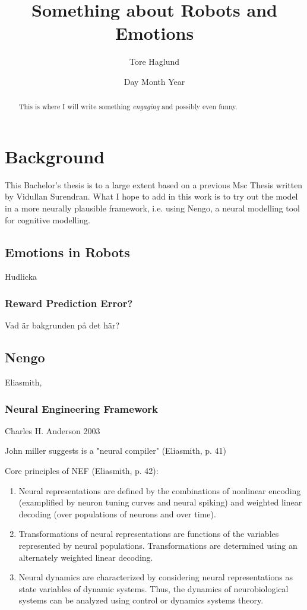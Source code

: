 \documentclass[12pt]{article}
\title{Something about Robots and Emotions}
\author{Tore Haglund}
\date{Day Month Year}
\begin{document}
              
\maketitle

\begin{abstract}
This is where I will write something \emph{engaging} and possibly even funny.
\end{abstract}
\tableofcontents

\section{Background}
This Bachelor's thesis is to a large extent based on a previous Msc Thesis written by Vidullan Surendran. What I hope to add in this work is to try out the model in a more neurally plausible framework, i.e. using Nengo, a neural modelling tool for cognitive modelling. \cite{picardbook} 

\subsection{Emotions in Robots}
Hudlicka 

\subsubsection{Reward Prediction Error?}
Vad är bakgrunden på det här? 

\subsection{Nengo}
Eliasmith,

\subsubsection{Neural Engineering Framework}
Charles H. Anderson 2003

John miller suggests is a "neural compiler" (Eliasmith, p. 41)

Core principles of NEF (Eliasmith, p. 42):
\begin{enumerate}
\item Neural representations are defined by the combinations of nonlinear encoding (examplified by neuron tuning curves and neural spiking) and weighted linear decoding (over populations of neurons and over time).
\item Transformations of neural representations are functions of the variables represented by neural populations. Transformations are determined using an alternately weighted linear decoding. 
\item Neural dynamics are characterized by considering neural representations as state variables of dynamic systems. Thus, the dynamics of neurobiological systems can be analyzed using control or dynamics systems theory.
\end{enumerate}
\end{document}
